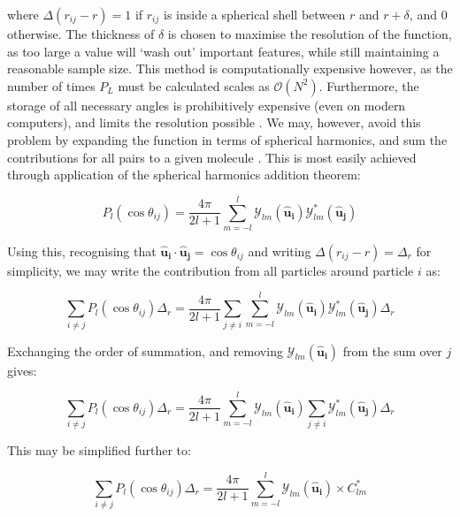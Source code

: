 \documentclass[11pt, a4paper]{article} %
\begin{document}
\begin{appendices}
where $\Delta(r_{ij}-r) = 1$ if $r_{ij}$ is inside a spherical shell between $r$ and $r+\delta$, and $0$ otherwise. The thickness of $\delta$ is chosen to maximise the resolution of the function, as too large a value will `wash out' important features, while still maintaining a reasonable sample size. This method is computationally expensive however, as the number of times $P_{L}$ must be calculated scales as $\mathcal{O}(N^{2})$. Furthermore, the storage of all necessary angles is prohibitively expensive (even on modern computers), and limits the resolution possible \cite{Soper1998}. We may, however, avoid this problem by expanding the function in terms of spherical harmonics, and sum the contributions for all pairs to a given molecule \cite{Soper1994}. This is most easily achieved through application of the spherical harmonics addition theorem:

\begin{equation}
P_{l}(\cos \theta_{ij}) = \frac{4\pi}{2l+1} \sum_{m=-l}^{l} \mathcal{Y}_{lm}(\boldsymbol{\hat{u}_{i}}) \mathcal{Y}_{lm}^{*}(\boldsymbol{\hat{u}_{j}})
\end{equation}

Using this, recognising that $\boldsymbol{\hat{u}_{i}}\cdot \boldsymbol{\hat{u}_{j}} = \cos \theta_{ij}$ and writing  $\Delta(r_{ij}-r) = \Delta_{r}$ for simplicity, we may write the contribution from all particles around particle $i$ as:

\begin{equation}
\sum_{i \neq j} P_{l}(\cos \theta_{ij}) \Delta_{r} =  \frac{4\pi}{2l+1} \sum_{j \neq i} \sum_{m=-l}^{l} \mathcal{Y}_{lm}(\boldsymbol{\hat{u}_{i}}) \mathcal{Y}_{lm}^{*}(\boldsymbol{\hat{u}_{j}}) \Delta_{r}
\end{equation}

Exchanging the order of summation, and removing $\mathcal{Y}_{lm}(\boldsymbol{\hat{u}_{i}})$ from the sum over $j$ gives:

\begin{equation}
\sum_{i \neq j} P_{l}(\cos \theta_{ij}) \Delta_{r} =  \frac{4\pi}{2l+1} \sum_{m=-l}^{l} \mathcal{Y}_{lm}(\boldsymbol{\hat{u}_{i}}) \sum_{j \neq i}  \mathcal{Y}_{lm}^{*}(\boldsymbol{\hat{u}_{j}}) \Delta_{r}
\end{equation}

This may be simplified further to:

\begin{equation} \label{eq:pairwise_finalres}
\sum_{i \neq j} P_{l}(\cos \theta_{ij}) \Delta_{r} =  \frac{4\pi}{2l+1} \sum_{m=-l}^{l} \mathcal{Y}_{lm}(\boldsymbol{\hat{u}_{i}}) \times C_{lm}^{*}
\end{equation}


\end{appendices}
\end{document}
